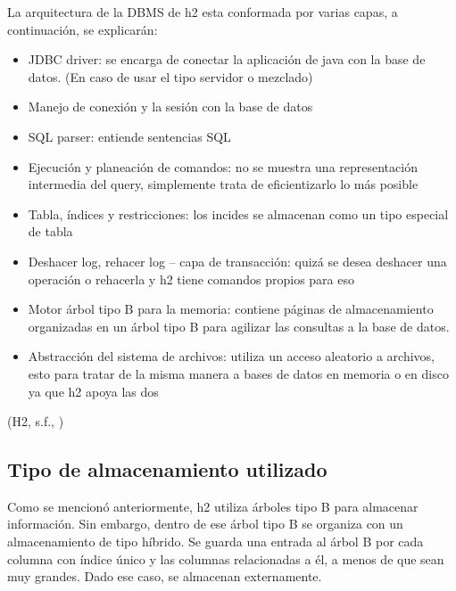 \documentclass{acmart}
\begin{document}
  





La arquitectura de la DBMS de h2 esta conformada por varias capas, a continuación, se explicarán:

\begin{itemize}

\item JDBC driver: se encarga de conectar la aplicación de java con la base de datos. (En caso de usar el tipo servidor o mezclado)

\item Manejo de conexión y la sesión con la base de datos

\item SQL parser: entiende sentencias SQL

\item Ejecución y planeación de comandos: no se muestra una representación intermedia del query, simplemente trata de eficientizarlo lo más posible

\item Tabla, índices y restricciones: los incides se almacenan como un tipo especial de tabla

\item Deshacer log, rehacer log – capa de transacción: quizá se desea deshacer una operación o rehacerla y h2 tiene comandos propios para eso

\item Motor árbol tipo B para la memoria: contiene páginas de almacenamiento organizadas en un árbol tipo B para agilizar las consultas a la base de datos.

\item Abstracción del sistema de archivos: utiliza un acceso aleatorio a archivos, esto para tratar de la misma manera a bases de datos en memoria o en disco ya que h2 apoya las dos



\end{itemize}

(H2, s.f., \cite{h2features})

\subsection{Tipo de almacenamiento utilizado}

Como se mencionó anteriormente, h2 utiliza árboles tipo B para almacenar información. Sin embargo, dentro de ese árbol tipo B se organiza con un almacenamiento de tipo híbrido. Se guarda una entrada al árbol B por cada columna con índice único y las columnas relacionadas a él, a menos de que sean muy grandes. Dado ese caso, se almacenan externamente.   
\end{document}
